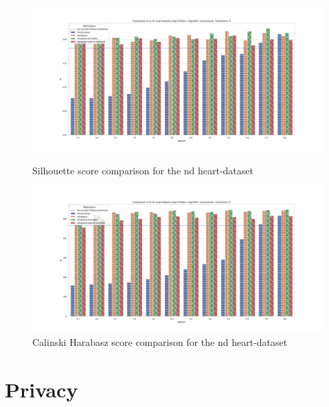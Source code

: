 \begin{figure}[H]
    \centering
    \begin{minipage}[c]{0.8\textwidth}
        \includegraphics[width=1\textwidth]{Results/RQ2-nd/heart-dataset/sc_heart-dataset_comparison.png}
        \caption{Silhouette score comparison for the nd heart-dataset}
        \label{fig:appendix-sc_heart-dataset_comparison_nd}
    \end{minipage}
    \begin{minipage}[c]{0.8\textwidth}
        \includegraphics[width=1\textwidth]{Results/RQ2-nd/heart-dataset/ch_heart-dataset_comparison.png}
        \caption{Calinski Harabasz score comparison for the nd heart-dataset}
        \label{fig:appendix-ch_heart-dataset_comparison_nd}
    \end{minipage}

\end{figure}
\section{Privacy}
